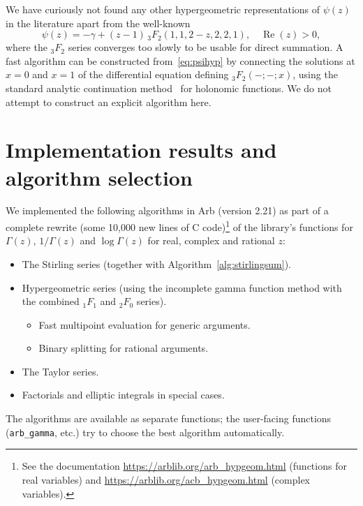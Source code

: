 \documentclass[reqno]{amsart}
\newcommand{\Real}{\operatorname{Re}}
\theoremstyle{definition}
\begin{document}
We have curiously not found any other hypergeometric
representations of $\psi(z)$ in the literature
apart from the well-known
\begin{equation}
\psi(z) = -\gamma + \left(z - 1\right) \,{}_3F_2(1, 1, 2 - z, 2, 2, 1), \quad \Real(z) > 0,
\label{eq:psihyp}
\end{equation}
where the ${}_3F_2$ series converges too slowly to
be usable for direct summation.
A fast algorithm can be constructed from~\eqref{eq:psihyp} 
by connecting the solutions at $x = 0$ and $x = 1$ of the differential
equation defining ${}_3F_2(-;-;x)$,
using the standard analytic continuation
method~\cite{vdH:hol,Mezzarobba2011} for holonomic functions.
We do not attempt to construct an explicit algorithm here.


\section{Implementation results and algorithm selection}

\label{sect:implresults}

We implemented the following algorithms in Arb (version 2.21)
as part of a complete rewrite (some 10,000 new lines of C code)\footnote{See the documentation \url{https://arblib.org/arb_hypgeom.html} (functions for real variables) and \url{https://arblib.org/acb_hypgeom.html} (complex variables).}
of the library's functions for
$\Gamma(z)$, $1/\Gamma(z)$ and $\log \Gamma(z)$
for real, complex and rational $z$:

\begin{itemize}
\item The Stirling series (together with Algorithm~\ref{alg:stirlingsum}).
\item Hypergeometric series (using the incomplete gamma function method with the combined ${}_1F_1$ and ${}_2F_0$ series).
\begin{itemize}
\item Fast multipoint evaluation for generic arguments.
\item Binary splitting for rational arguments.
\end{itemize}
\item The Taylor series.
\item Factorials and elliptic integrals in special cases.
\end{itemize}

The algorithms are available as separate
functions; the user-facing functions (\texttt{arb\_gamma}, etc.)
try to choose the best algorithm automatically.
\end{document}
